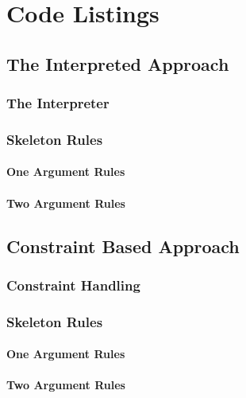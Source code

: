 \chapter{Code Listings}

\section{The Interpreted Approach}

\subsection{The Interpreter}



\pagebreak

\subsection{Skeleton Rules}

\subsubsection{One Argument Rules}


\pagebreak
\subsubsection{Two Argument Rules}


\pagebreak
\section{Constraint Based Approach}

\subsection{Constraint Handling}


\pagebreak
\subsection{Skeleton Rules}

\subsubsection{One Argument Rules}


\pagebreak
\subsubsection{Two Argument Rules}


\pagebreak
%
%